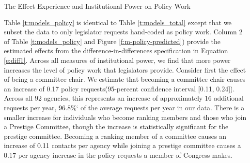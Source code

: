 \begin{table}[hbt!]
\caption{The Effect Experience and Institutional Power on Policy Work} \label{t:models_policy}
\begin{minipage}{\textwidth}
\begin{center}
\end{center}
\end{minipage}
\end{table}


Table \ref{t:models_policy} is identical to Table \ref{t:models_total} except that we subset the data to only legislator requests hand-coded as policy work. 
Column 2 of Table \ref{t:models_policy} and Figure \ref{f:m-policy-predicted}) provide the estimated effects from the difference-in-differences specification in Equation \ref{e:diff1}. Across all measures of institutional power, we find that more power increases the level of policy work that legislators provide. Consider first the effect of being a committee chair. We estimate that becoming a committee chair causes an increase of 0.17  policy requests(95-percent confidence interval [0.11, 0.24]). Across all 92 agencies, this represents an increase of approximately 16 additional requests per year, 96.8\%` of the average requests per year in our data. There is a smaller increase for individuals who become ranking members and those who join a Prestige Committee, though the increase is statistically significant for the prestige committee. Becoming a ranking member of a committee causes an increase of 0.11 contacts per agency while joining a prestige committee causes a 0.17 per agency increase in the policy requests a member of Congress makes.


